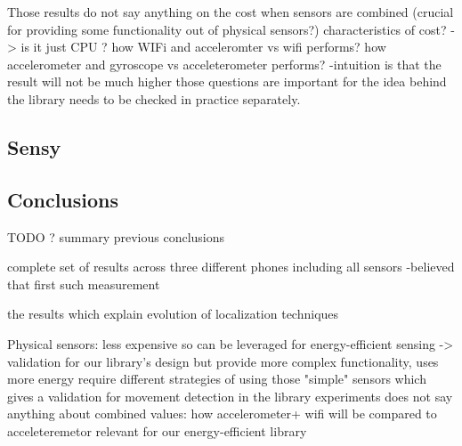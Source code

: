 Those results do not say anything on the cost when sensors are combined
		(crucial for providing some functionality out of physical sensors?)
		characteristics of cost? -> is it just CPU ?
			how WIFi and acceleromter vs wifi performs?
			how accelerometer and gyroscope vs acceleterometer performs?
				-intuition is that the result will not be much higher
			those questions are important for the idea behind  the library
				needs to be checked in practice separately.	
						
\subsection{Sensy}
\subsection{Conclusions}
	TODO ? summary previous conclusions
	
	complete set of results across three different phones including all sensors
		-believed that first such measurement
		
	the results which explain evolution of localization techniques
	
	Physical sensors:
		less expensive so can be leveraged for energy-efficient sensing
			-> validation for our library's design
		but provide more complex functionality, uses more energy
			require different strategies of using those "simple" sensors
				which gives a validation for movement detection in the library
		experiments does not say anything about combined values:
			how accelerometer+ wifi will be compared to acceleteremetor
				relevant for our energy-efficient library
	
